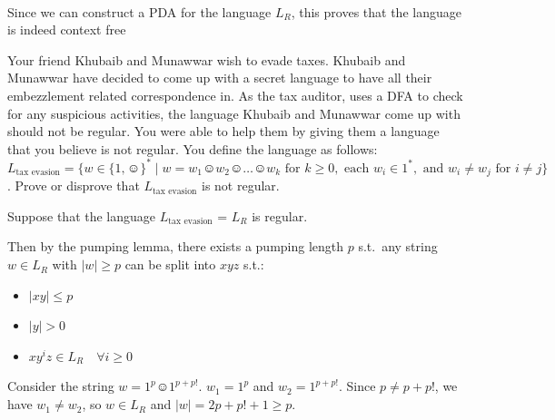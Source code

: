 \documentclass[a4paper]{exam}
\begin{document}
\begin{questions}
\begin{parts}
\begin{solution}
\\
			Since we can construct a PDA for the language $L_R$, this proves that the language is indeed context free
		\end{solution}

	\end{parts}



	\question[10] Your friend Khubaib and Munawwar wish to evade taxes. Khubaib and Munawwar have decided to come up with a secret language to have all their embezzlement related correspondence in.
	As the tax auditor, uses a DFA to check for any suspicious activities, the language Khubaib and Munawwar come up with should not be regular.
	You were able to help them by giving them a language that you believe is not regular. You define the language as follows: $L_{\text{tax evasion}} = \{ w \in \{1, \smiley \}^* \mid w = w_1\smiley w_2\smiley \dots \smiley w_k \text{ for } k \geq 0, \text{ each } w_i \in 1^*, \text{ and } w_i \neq w_j \text{ for } i \neq j \}$. Prove or disprove that $L_{\text{tax evasion}}$ is not regular.

	\begin{solution}

		Suppose that the language $L_{\text{tax evasion}}$ = $L_R$ is regular.

		Then by the pumping lemma, there exists a pumping length $p$ s.t.\ any string $w \in L_R$ with $|w| \geq p$ can be split into $xyz$ s.t.:
		\begin{itemize}
			\item[] $|xy| \leq p$
			\item[] $|y| > 0$
			\item[] $xy^iz \in L_R \quad \forall i \geq 0$
		\end{itemize}

		Consider the string $w = 1^p \smiley 1^{p + p!}$. $w_1 = 1^p$ and $w_2 = 1^{p + p!}$. Since $p \neq p + p!$, we have $w_1 \neq w_2$, so $w \in L_R$ and $|w| = 2p + p! + 1 \geq p$.


\end{solution}
\end{questions}
\end{document}
